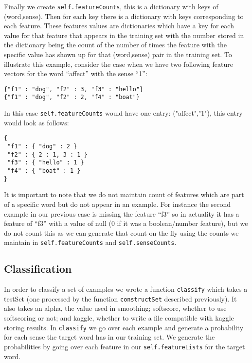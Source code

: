 \documentclass{article}
\begin{document}
Finally we create \texttt{self.featureCounts}, this is a dictionary with keys of (word,sense). Then for each key there is a dictionary with keys corresponding to each feature. These features values are dictionaries which have a key for each value for that feature that appears in the training set with the number stored in the dictionary being the count of the number of times the feature with the specific value has shown up for that (word,sense) pair in the training set. To illustrate this example, consider the case when we have two following feature vectors for the word ``affect'' with the sense ``1'':
{\small
\begin{verbatim}
{"f1" : "dog", "f2" : 3, "f3" : "hello"}
{"f1" : "dog", "f2" : 2, "f4" : "boat"}
\end{verbatim}
}
In this case \texttt{self.featureCounts} would have one entry: ("affect","1"), this entry would look as follows:
{\small
\begin{verbatim}
{
 "f1" : { "dog" : 2 }
 "f2" : { 2 : 1, 3 : 1 }
 "f3" : { "hello" : 1 }
 "f4" : { "boat" : 1 }
}
\end{verbatim}
}

It is important to note that we do not maintain count of features which are part of a specific word but do not appear in an example. For instance the second example in our previous case is missing the feature ``f3'' so in actuality it has a feature of ``f3'' with a value of null (0 if it was a boolean/number feature), but we do not count this as we can generate that count on the fly using the counts we maintain in \texttt{self.featureCounts} and \texttt{self.senseCounts}.

\subsection{Classification}

In order to classify a set of examples we wrote a function \texttt{classify} which takes a testSet (one processed by the function \texttt{constructSet} described previously). It also takes an alpha, the value used in smoothing; softscore, whether to use softscoring or not; and kaggle, whether to write a file compatible with kaggle storing results. In \texttt{classify} we go over each example and generate a probability for each sense the target word has in our training set. We generate the probabilities by going over each feature in our \texttt{self.featureLists} for the target word.
\end{document}
